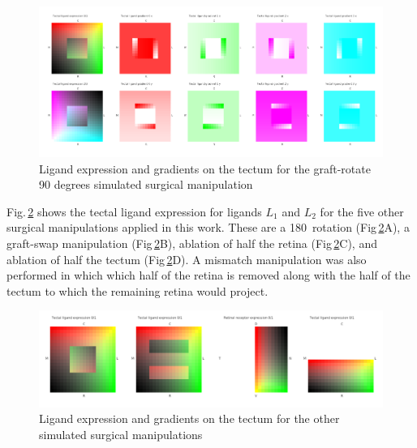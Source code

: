 \documentclass[11pt, a4paper]{article}
\begin{document}
%
\begin{figure}
\includegraphics[width=\linewidth]{./images/Tissuevisb.png}
\caption{Ligand expression and gradients on the tectum for the
graft-rotate 90 degrees simulated surgical manipulation}
\label{f:trot90}
\end{figure}

Fig.\,\ref{f:tmanip} shows the tectal ligand expression for ligands $L_1$ and
$L_2$ for the five other surgical manipulations applied in this work. These
are a 180\degree~rotation (Fig\,\ref{f:tmanip}A), a graft-swap manipulation
(Fig\,\ref{f:tmanip}B), ablation of half the retina (Fig\,\ref{f:tmanip}C),
and ablation of half the tectum (Fig\,\ref{f:tmanip}D). A mismatch
manipulation was also performed in which which half of the retina is removed
along with the half of the tectum to which the remaining retina would project.

\begin{figure}
\includegraphics[width=\linewidth]{./images/expressions_manipulations.png}
\caption{Ligand expression and gradients on the tectum for the
other simulated surgical manipulations}
\label{f:tmanip}
\end{figure}
\end{document}
